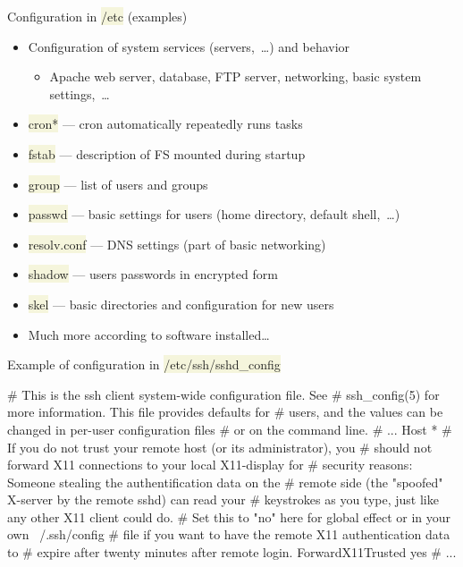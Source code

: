 \documentclass[compress, ucs, xelatex, 11pt, xcolor=svgnames, aspectratio=169,
	hyperref={
		bookmarks=true,
		unicode=true,
		colorlinks=true,
		pdftitle={Linux, command line and MetaCentrum},
		plainpages=false,
		pdfauthor={Vojtech Zeisek},
		pdfsubject={Course about use of Linux command line, writing shell scripts and using MetaCentrum of CESNET},
		pdfcreator={XeLaTeX},
		pdfkeywords={Linux, GNU, BASH, shell, command line, MetaCentrum},
		linkcolor=DarkRed, %
		anchorcolor=DarkBlue, %
		citecolor=Indigo, %
		filecolor=NavyBlue, %
		menucolor=DarkMagenta, %
		urlcolor=DarkBlue, %
		pdftex},
	url={hyphens, lowtilde} %
	]{beamer}
\renewcommand{\texttt}[1]{\colorbox{Beige}{{\ttfamily #1}}}
\begin{document}
\begin{frame}{Configuration in \texttt{/etc} (examples)}
	\begin{itemize}
		\item Configuration of system services (servers,~\ldots) and behavior
		\begin{itemize}
			\item Apache web server, database, FTP server, networking, basic system settings,~\ldots
		\end{itemize}
		\item \texttt{cron*} --- cron automatically repeatedly runs tasks
		\item \texttt{fstab} --- description of FS mounted during startup
		\item \texttt{group} --- list of users and groups
		\item \texttt{passwd} --- basic settings for users (home directory, default shell,~\ldots)
		\item \texttt{resolv.conf} ---  DNS settings (part of basic networking)
		\item \texttt{shadow} --- users passwords in encrypted form
		\item \texttt{skel} --- basic directories and configuration for new users
		\item Much more according to software installed\ldots
	\end{itemize}
\end{frame}

\begin{frame}[fragile]{Example of configuration in \texttt{/etc/ssh/sshd\_config}}
	\begin{bashcode}
    # This is the ssh client system-wide configuration file.  See
    # ssh_config(5) for more information.  This file provides defaults for
    # users, and the values can be changed in per-user configuration files
    # or on the command line.
    # ...
    Host *
    # If you do not trust your remote host (or its administrator), you
    # should not forward X11 connections to your local X11-display for
    # security reasons: Someone stealing the authentification data on the
    # remote side (the "spoofed" X-server by the remote sshd) can read your
    # keystrokes as you type, just like any other X11 client could do.
    # Set this to "no" here for global effect or in your own ~/.ssh/config
    # file if you want to have the remote X11 authentication data to
    # expire after twenty minutes after remote login.
    ForwardX11Trusted yes
    # ...
	\end{bashcode}
\end{frame}
\end{document}
